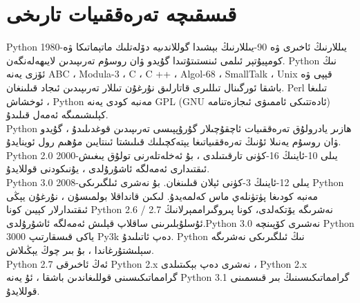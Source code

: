 \section{قىسقىچە تەرەققىيات تارىخى}
Python 1980-يىللارنىڭ ئاخىرى ۋە 90-يىللارنىڭ بېشىدا گوللاندىيە دۆلەتلىك ماتېماتىكا ۋە كومپيۇتېر ئىلمى ئىنستىتۇتىدا گۇيدو ۋان روسۇم تەرىپىدىن لايىھەلەنگەن.
Python نىڭ ئۆزى يەنە ABC ، Modula-3 ، C ، C ++ ، Algol-68 ، SmallTalk ، Unix قېپى ۋە باشقا ئورگىنال تىللىرى قاتارلىق نۇرغۇن تىللار تەرىپىدىن ئىجاد قىلىنغان.
Perl تىلىغا ئوخشاش ، Python مەنبە كودى يەنە GPL (GNU ئادەتتىكى ئاممىۋى ئىجازەتنامە) كېلىشىمىگە ئەمەل قىلىدۇ.\\
Python ھازىر يادرولۇق تەرەققىيات ئاچقۇچىلار گۇرۇپپىسى تەرىپىدىن قوغدىلىدۇ ، گۇيدو ۋان روسۇم يەنىلا ئۇنىڭ تەرەققىياتىغا يېتەكچىلىك قىلىشتا ئىنتايىن مۇھىم رول ئوينايدۇ.
Python 2.0  2000-يىلى 10-ئاينىڭ 16-كۈنى تارقىتىلدى ، بۇ ئەخلەتلەرنى تولۇق يىغىش ئىقتىدارى ئەمەلگە ئاشۇرۇلدى ، يۇنىكودنى قوللايدۇ.\\
Python 3.0  2008-يىلى 12-ئاينىڭ 3-كۈنى ئېلان قىلىنغان. بۇ نەشرى ئىلگىرىكى Python مەنبە كودىغا پۈتۈنلەي ماس كەلمەيدۇ. لىكىن قانداقلا بولمىسۇن ، نۇرغۇن يېڭى ئىقتىدارلار كېيىن كونا Python 2.6 / 2.7 نەشرىگە يۆتكەلدى، كونا پىروگىراممېرلانىڭ ئۇسلۇبلىرىنى ساقلاپ قېلىش ئەمەلگە ئاشۇرۇلدى.Python 3.0 نەشىرى كۆپىنچە Python 3000 ياكى قىسقارتىپ Py3k دەپ ئاتىلىدۇ. Python نىڭ ئىلگىرىكى نەشرىگە سېلىشتۇرغاندا ، بۇ بىر چوڭ يېڭىلاش.\\
Python 2.7 ئەڭ ئاخىرقى Python 2.x نەشرى دەپ بېكىتىلدى ، Python 2.x گرامماتىكىسىنى قوللىغاندىن باشقا ، ئۇ يەنە Python 3.1 گرامماتىكىسىنىڭ بىر قىسمىنى قوللايدۇ.\\

